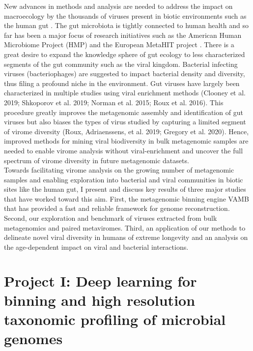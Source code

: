 New advances in methods and analysis are needed to address the impact on macroecology by the thousands of viruses present in biotic environments such as the human gut \cite{Carlson2019-lm}. The gut microbiota is tightly connected to human health and so far has been a major focus of research initiatives such as the American Human Microbiome Project (HMP)\cite{Turnbaugh2007-nw} and the European MetaHIT project \cite{Ehrlich2011-el}. There is a great desire to expand the knowledge sphere of gut ecology to less characterized segments of the gut community such as the viral kingdom. Bacterial infecting viruses (bacteriophages) are suggested to impact bacterial density and diversity, thus filing a profound niche in the environment. Gut viruses have largely been characterized in multiple studies using viral enrichment methods (Clooney et al. 2019; Shkoporov et al. 2019; Norman et al. 2015; Roux et al. 2016). This procedure greatly improves the metagenomic assembly and identification of gut viruses but also biases the types of virus studied by capturing a limited segment of virome diversity (Roux, Adriaenssens, et al. 2019; Gregory et al. 2020). Hence, improved methods for mining viral biodiversity in bulk metagenomic samples are needed to enable virome analysis without viral-enrichment and uncover the full spectrum of virome diversity in future metagenomic datasets.\\
\noindent
Towards facilitating virome analysis on the growing number of metagenomic samples and enabling exploration into bacterial and viral communities in biotic sites like the human gut, I present and discuss key results of three major studies that have worked toward this aim. First, the metagenomic binning engine VAMB that has provided a fast and reliable framework for genome reconstruction. Second, our exploration and benchmark of viruses extracted from bulk metagenomics and paired metaviromes. Third, an application of our methods to delineate novel viral diversity in humans of extreme longevity and an analysis on the age-dependent impact on viral and bacterial interactions.

\section{Project I: Deep learning for binning and high resolution taxonomic profiling of microbial genomes}

